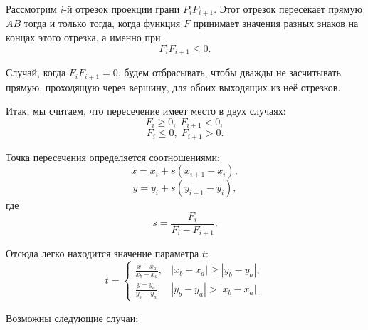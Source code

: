 Рассмотрим \( i \)-й отрезок проекции грани \( P_i P_{i+1} \). Этот отрезок пересекает прямую \( AB \) тогда и только тогда, когда функция \( F \) принимает значения разных знаков на концах этого отрезка, а именно при
\begin{equation}
F_i F_{i+1} \leq 0.
\label{eq:sign_check}
\end{equation}

Случай, когда \( F_i F_{i+1} = 0 \), будем отбрасывать, чтобы дважды не засчитывать прямую, проходящую через вершину, для обоих выходящих из неё отрезков.

Итак, мы считаем, что пересечение имеет место в двух случаях:
\begin{equation}
F_i \geq 0, \; F_{i+1} < 0,
\label{eq:case_1}
\end{equation}
\begin{equation}
F_i \leq 0, \; F_{i+1} > 0.
\label{eq:case_2}
\end{equation}

Точка пересечения определяется соотношениями:
\begin{equation}
x = x_i + s(x_{i+1} - x_i),
\label{eq:x_intersection}
\end{equation}
\begin{equation}
y = y_i + s(y_{i+1} - y_i),
\label{eq:y_intersection}
\end{equation}
где 
\begin{equation}
s = \frac{F_i}{F_i - F_{i+1}}.
\label{eq:parameter_s}
\end{equation}

Отсюда легко находится значение параметра \( t \):
\begin{equation}
t = 
\begin{cases} 
    \frac{x - x_a}{x_b - x_a}, & |x_b - x_a| \geq |y_b - y_a|, \\ 
    \frac{y - y_a}{y_b - y_a}, & |y_b - y_a| > |x_b - x_a|. 
\end{cases}
\label{eq:parameter_t}
\end{equation}

Возможны следующие случаи:

